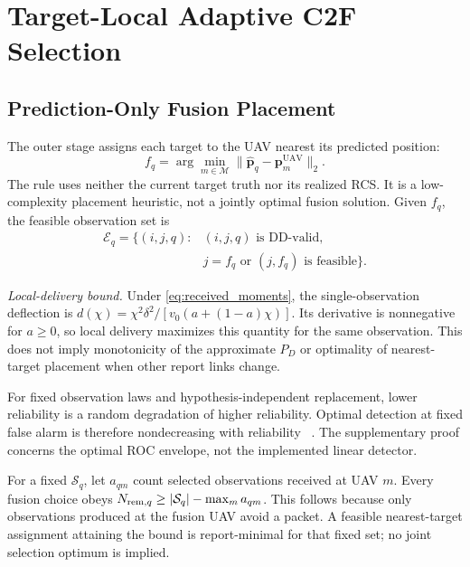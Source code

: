 \section{Target-Local Adaptive C2F Selection}
\label{sec:proposed_algorithm}

\subsection{Prediction-Only Fusion Placement}

The outer stage assigns each target to the UAV nearest its predicted position:
\begin{equation}
	f_q=\arg\min_{m\in\mathcal M}
	\|\widehat{\mathbf p}_q-\mathbf p_m^{\mathrm{UAV}}\|_2 .
	\label{eq:nearest_target_fusion}
\end{equation}
The rule uses neither the current target truth nor its realized RCS. It is a
low-complexity placement heuristic, not a jointly optimal fusion solution.
Given $f_q$, the feasible observation set is
\begin{equation}
\begin{aligned}
	\mathcal E_q=\{(i,j,q):{}&(i,j,q)\text{ is DD-valid},\\
	&j=f_q\text{ or }(j,f_q)\text{ is feasible}\}.
\end{aligned}
	\label{eq:feasible_candidate_set}
\end{equation}

\noindent\textit{Local-delivery bound.}
Under \eqref{eq:received_moments}, the single-observation deflection is
$d(\chi)=\chi^2\delta^2/[v_0(a+(1-a)\chi)]$. Its derivative is nonnegative
for $a\ge0$, so local delivery maximizes this quantity for the same observation.
This does not imply monotonicity of the approximate $P_D$ or optimality of
nearest-target placement when other report links change.

For fixed observation laws and hypothesis-independent replacement, lower
reliability is a random degradation of higher reliability. Optimal detection
at fixed false alarm is therefore nondecreasing with reliability
~\cite{blackwell_experiments}. The supplementary proof concerns the optimal
ROC envelope, not the implemented linear detector.

For a fixed $\mathcal S_q$, let $a_{qm}$ count selected observations received
at UAV $m$. Every fusion choice obeys
$N_{{\rm rem},q}\ge |\mathcal S_q|-\max_m a_{qm}$.
This follows because only observations produced at the fusion UAV avoid a
packet. A feasible nearest-target assignment attaining the bound is
report-minimal for that fixed set; no joint selection optimum is implied.

